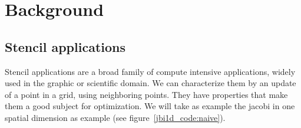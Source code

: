 \documentclass[a4paper,11pt]{article}
\begin{document}
\section{Background}
\subsection{Stencil applications}
Stencil applications are a broad family of compute intensive applications, widely used in
the graphic or scientific domain. We can characterize them by an update of a point in a
grid, using neighboring points. They have properties that make them a good subject for
optimization. We will take as example the jacobi in one spatial dimension as example 
(see figure~\ref{jbi1d_code:naive}).
\end{document}
